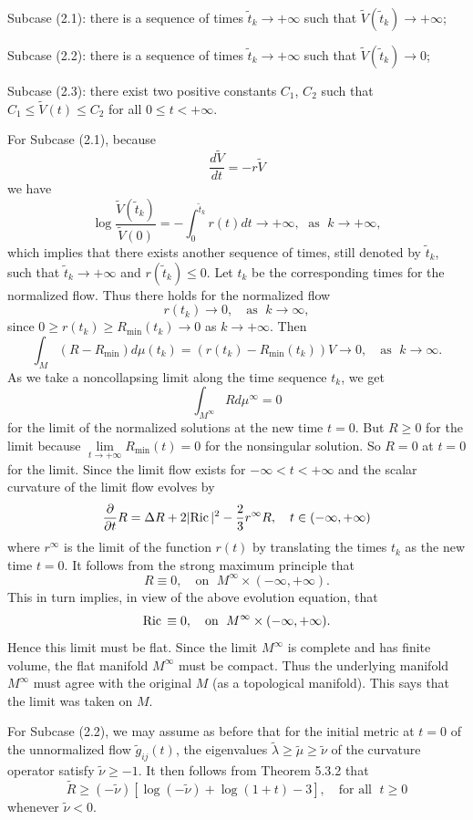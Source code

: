 Subcase (2.1): there is a sequence of times
$\tilde{t}_k\rightarrow+\infty$ such that
$\tilde{V}(\tilde{t}_k)\rightarrow+\infty$;

Subcase (2.2): there is a sequence of times
$\tilde{t}_k\rightarrow+\infty$ such that
$\tilde{V}(\tilde{t}_k)\rightarrow0$;

Subcase (2.3): there exist two positive constants $C_1$, $C_2$
such that $C_1\leq\tilde{V}(t)\leq C_2$ for all $0\leq t<+\infty$.

For Subcase (2.1), because
$$
\frac{d\tilde{V}}{dt}=-r\tilde{V}
$$
we have
$$
\log\frac{\tilde{V}(\tilde{t}_k)}{\tilde{V}(0)}
=-\int_0^{\tilde{t}_k}r(t)dt\rightarrow+\infty,\; \text{ as }\;
k\rightarrow+\infty,
$$
which implies that there exists another sequence of times, still
denoted by $\tilde{t}_k$, such that
$\tilde{t}_k\rightarrow+\infty$ and $r(\tilde{t}_k)\leq0$. Let
$t_k$ be the corresponding times for the normalized flow. Thus
there holds for the normalized flow
$$
r(t_k)\rightarrow0,\quad\text{as }\; k\rightarrow\infty,
$$
since $0\geq r(t_k)\geq R_{\min}(t_k)\rightarrow0$ as
$k\rightarrow+\infty$. Then
$$
\int_M(R-R_{\min})d\mu(t_k)=(r(t_k)-R_{\min}(t_k))V\rightarrow0,
\quad \text{as }\; k\rightarrow\infty.
$$
As we take a noncollapsing limit along the time sequence $t_k$, we
get
$$
\int_{M^\infty}Rd\mu^\infty=0
$$
for the limit of the normalized solutions at the new time $t=0$.
But $R\geq0$ for the limit because
$\lim\limits_{t\rightarrow+\infty}R_{\min}(t)=0$ for the
nonsingular solution. So $R=0$ at $t=0$ for the limit. Since the
limit flow exists for $-\infty<t<+\infty$ and the scalar curvature
of the limit flow evolves by
$$
\frac{\partial}{\partial t}R=\Delta
R+2|{\rm Ric}\,|^2-\frac{2}{3}r^\infty R,\quad t\in(-\infty,+\infty)
$$
where $r^\infty$ is the limit of the function $r(t)$ by
translating the times $t_k$ as the new time $t=0$. It follows from
the strong maximum principle that
$$
R\equiv0, \quad \text{on }\; M^\infty\times(-\infty,+\infty).
$$
This in turn implies, in view of the above evolution equation,
that
$$
{\rm Ric}\,\equiv0, \quad \text{on }\; M^\infty\times(-\infty,+\infty).
$$
Hence this limit must be flat. Since the limit $M^\infty$ is
complete and has finite volume, the flat manifold $M^\infty$ must
be compact. Thus the underlying manifold $M^\infty$ must agree
with the original $M$ (as a topological manifold). This says that
the limit was taken on $M$.

For Subcase (2.2), we may assume as before that for the initial
metric at $t=0$ of the unnormalized flow $\tilde{g}_{ij}(t)$, the
eigenvalues $\tilde{\lambda}\geq\tilde{\mu}\geq\tilde{\nu}$ of the
curvature operator satisfy $\tilde{\nu}\geq-1$. It then follows
from Theorem 5.3.2 that
$$
\tilde{R}\geq(-\tilde{\nu})[\log(-\tilde{\nu})+\log(1+t)-3], \quad
\text{for all }\; t\geq0
$$
whenever $\tilde{\nu}<0$.


